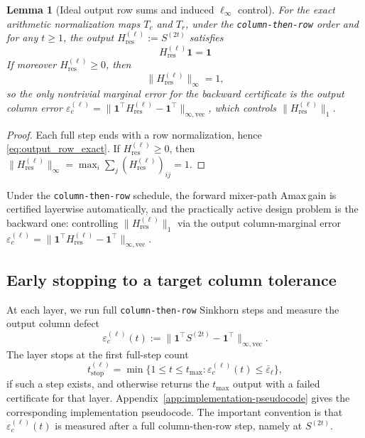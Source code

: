 \documentclass[11pt]{article}
\numberwithin{equation}{section}
\theoremstyle{plain}
\newtheorem{lemma}[theorem]{Lemma}
\theoremstyle{definition}
\theoremstyle{remark}
\newcommand{\ones}{\mathbf{1}}
\newcommand{\Hres}{H_{\mathrm{res}}}
\newcommand{\Amax}{\textsf{Amax}\,}
\begin{document}
\begin{lemma}[Ideal output row sums and induced $\ell_\infty$ control]\label{lem:output_rows_exact}
For the exact arithmetic normalization maps $T_c$ and $T_r$, under the \texttt{column-then-row} order and for any $t\ge 1$, the output $\Hres^{(\ell)}:=S^{(2t)}$ satisfies
\begin{equation}\label{eq:output_row_exact}
\Hres^{(\ell)}\ones=\ones
\end{equation}
If moreover $\Hres^{(\ell)}\ge 0$, then
\begin{equation}\label{eq:output_inf_norm_one}
\|\Hres^{(\ell)}\|_\infty = 1,
\end{equation}
so the only nontrivial marginal error for the backward certificate is the output column error
$\varepsilon_c^{(\ell)}=\|\ones^\top \Hres^{(\ell)}-\ones^\top\|_{\infty,\mathrm{vec}}$, which controls $\|\Hres^{(\ell)}\|_1$.
\end{lemma}

\begin{proof}
Each full step ends with a row normalization, hence \eqref{eq:output_row_exact}. If $\Hres^{(\ell)}\ge 0$, then
$\|\Hres^{(\ell)}\|_\infty=\max_i\sum_j (\Hres^{(\ell)})_{ij}=1$.
\end{proof}

Under the \texttt{column-then-row} schedule, the forward mixer-path \Amax gain is certified layerwise automatically, and the
practically active design problem is the backward one: controlling $\|\Hres^{(\ell)}\|_1$ via the output column-marginal error
$\varepsilon_c^{(\ell)}=\|\ones^\top \Hres^{(\ell)}-\ones^\top\|_{\infty,\mathrm{vec}}$.

\subsection{Early stopping to a target column tolerance}\label{subsec:earlystop_alg}

At each layer, we run full \texttt{column-then-row} Sinkhorn steps and measure the
output column defect
\begin{equation}\label{eq:early-stop-measured-eps}
    \varepsilon_c^{(\ell)}(t)
    :=
    \|\ones^\top S^{(2t)}-\ones^\top\|_{\infty,\mathrm{vec}}.
\end{equation}
The layer stops at the first full-step count
\begin{equation}\label{eq:early-stop-rule}
    t_{\mathrm{stop}}^{(\ell)}
    =
    \min\{1\le t\le t_{\max}:
    \varepsilon_c^{(\ell)}(t)\le \bar\varepsilon_\ell\},
\end{equation}
if such a step exists, and otherwise returns the \(t_{\max}\) output with a failed
certificate for that layer.  Appendix~\ref{app:implementation-pseudocode} gives
the corresponding implementation pseudocode.  The important convention is that
\(\varepsilon_c^{(\ell)}(t)\) is measured after a full column-then-row step,
namely at \(S^{(2t)}\).
\end{document}
